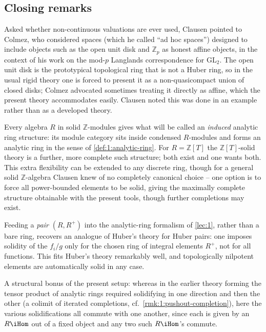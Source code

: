 \subsection{Closing remarks}

\begin{remark}
\label{rmk:7:colmez}
Asked whether non-continuous valuations are ever used, Clausen pointed to
Colmez, who considered spaces (which he called ``ad hoc spaces'') designed to
include objects such as the open unit disk and $\mathbb{Z}_p$ as honest affine
objects, in the context of his work on the mod-$p$ Langlands correspondence for
$\mathrm{GL}_2$. The open unit disk is the prototypical topological ring that is
not a Huber ring, so in the usual rigid theory one is forced to present it as a
non-quasicompact union of closed disks; Colmez advocated sometimes treating it
directly as affine, which the present theory accommodates easily. Clausen noted
this was done in an example rather than as a developed theory.
\end{remark}

\begin{remark}
\label{rmk:7:analytic-ring}
Every algebra $R$ in solid $\mathbb{Z}$-modules gives what will be called an
\emph{induced} analytic ring structure: its module category sits inside
condensed $R$-modules and forms an analytic ring in the sense of
\cref{def:1:analytic-ring}. For $R=\mathbb{Z}[T]$ the $\mathbb{Z}[T]$-solid
theory is a further, more complete such structure; both exist and one wants
both. This extra flexibility can be extended to any discrete ring, though for a
general solid $\mathbb{Z}$-algebra Clausen knew of no completely canonical
choice -- one option is to force all power-bounded elements to be solid, giving
the maximally complete structure obtainable with the present tools, though
further completions may exist.

Feeding a \emph{pair} $(R,R^{+})$ into the analytic-ring formalism of
\cref{lec:1}, rather than a bare ring, recovers an analogue of Huber's theory
for Huber pairs: one imposes solidity of the $f_i/g$ only for the chosen ring
of integral elements $R^{+}$, not for all functions. This fits Huber's theory
remarkably well, and topologically nilpotent elements are automatically solid
in any case.
\end{remark}

\begin{remark}
\label{rmk:7:solidifications-commute}
A structural bonus of the present setup: whereas in the earlier theory forming
the tensor product of analytic rings required solidifying in one direction and
then the other (a colimit of iterated completions, cf.\
\cref{rmk:1:pushout-completion}), here the various solidifications all commute
with one another, since each is given by an $R\iHom$ out of a fixed object and
any two such $R\iHom$'s commute.
\end{remark}
